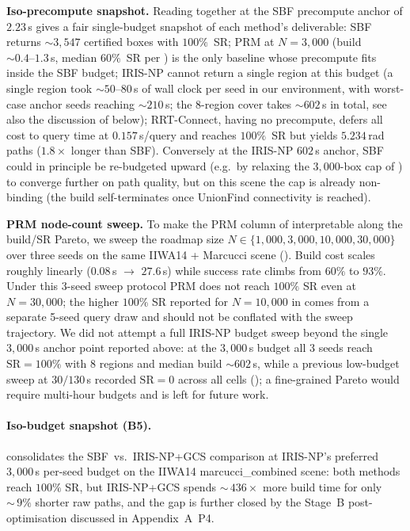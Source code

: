 \documentclass[journal]{IEEEtran}
\begin{document}
\textbf{Iso-precompute snapshot.}
Reading  together at the SBF
precompute anchor of $2.23$\,s gives a fair single-budget snapshot of
each method's deliverable: SBF returns ${\sim}3{,}547$ certified boxes
with $100\%$~SR; PRM at $N{=}3{,}000$ (build ${\sim}0.4\text{--}1.3$\,s,
median $60\%$~SR per ) is the only baseline whose
precompute fits inside the SBF budget; IRIS-NP cannot return a single
region at this budget (a single region took ${\sim}50\text{--}80$\,s
of wall clock per seed in our environment, with worst-case anchor
seeds reaching ${\sim}210$\,s; the 8-region cover takes ${\sim}602$\,s
in total, see also the discussion of
 below); RRT-Connect, having no precompute,
defers all cost to query time at $0.157$\,s/query and reaches $100\%$~SR
but yields $5.234$\,rad paths ($1.8\times$ longer than SBF). Conversely
at the IRIS-NP $602$\,s anchor, SBF could in principle be re-budgeted
upward (e.g.\ by relaxing the $3{,}000$-box cap of
) to converge further on path quality, but on
this scene the cap is already non-binding (the build self-terminates
once UnionFind connectivity is reached).

\textbf{PRM node-count sweep.}
To make the PRM column of  interpretable along the
build/SR Pareto, we sweep the roadmap size
$N \in \{1{,}000, 3{,}000, 10{,}000, 30{,}000\}$ over three seeds on the
same IIWA14 + Marcucci scene (). Build cost scales
roughly linearly ($0.08$\,s $\to$ $27.6$\,s) while success rate climbs
from $60\%$ to $93\%$. Under this 3-seed sweep protocol PRM does not
reach $100\%$ SR even at $N{=}30{,}000$; the higher $100\%$ SR reported
for $N{=}10{,}000$ in  comes from a separate
5-seed query draw and should not be conflated with the sweep
trajectory. We did not attempt a full IRIS-NP budget sweep beyond
the single $3{,}000$\,s anchor point reported above: at the
$3{,}000$\,s budget all 3 seeds reach $\text{SR}=100\%$ with $8$
regions and median build $\sim 602$\,s, while a previous low-budget
sweep at $30/130$\,s recorded $\text{SR}=0$ across all cells
(); a fine-grained Pareto would
require multi-hour budgets and is left for future work.

\paragraph{Iso-budget snapshot (B5).}
 consolidates the SBF~vs.\ IRIS-NP+GCS
comparison at IRIS-NP's preferred $3{,}000$\,s per-seed budget on
the IIWA14 marcucci\_combined scene: both methods reach $100\%$
SR, but IRIS-NP+GCS spends ${\sim}\,436{\times}$ more build time
for only ${\sim}\,9\%$ shorter raw paths, and the gap is further
closed by the Stage~B post-optimisation discussed in
Appendix~A~P4.

\end{document}
